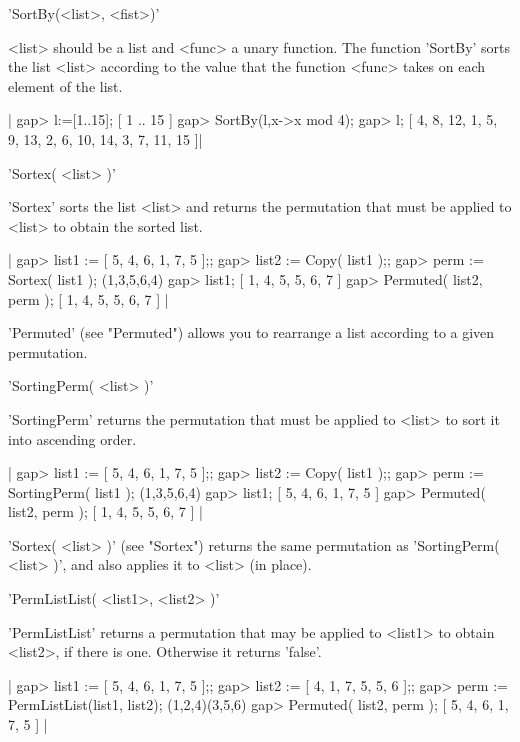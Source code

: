'SortBy(<list>, <fist>)'

<list>  should be a list and <func> a unary function. The function 'SortBy'
sorts the list <list> according to the value that the function <func> takes
on each element of the list.

|   gap> l:=[1..15];
   [ 1 .. 15 ]
   gap> SortBy(l,x->x mod 4);      
   gap> l;
   [ 4, 8, 12, 1, 5, 9, 13, 2, 6, 10, 14, 3, 7, 11, 15 ]|


'Sortex( <list> )'

'Sortex' sorts the list <list> and  returns the  permutation that must be
applied to <list> to obtain the sorted list.

|    gap> list1 := [ 5, 4, 6, 1, 7, 5 ];;
    gap> list2 := Copy( list1 );;
    gap> perm := Sortex( list1 );
    (1,3,5,6,4)
    gap> list1;
    [ 1, 4, 5, 5, 6, 7 ]
    gap> Permuted( list2, perm );
    [ 1, 4, 5, 5, 6, 7 ] |

'Permuted' (see "Permuted") allows you to rearrange a list according to a
given permutation.


'SortingPerm( <list> )'

'SortingPerm' returns  the permutation that must be  applied to <list> to
sort it into ascending order.

|    gap> list1 := [ 5, 4, 6, 1, 7, 5 ];;
    gap> list2 := Copy( list1 );;
    gap> perm := SortingPerm( list1 );
    (1,3,5,6,4)
    gap> list1;
    [ 5, 4, 6, 1, 7, 5 ]
    gap> Permuted( list2, perm );
    [ 1, 4, 5, 5, 6, 7 ] |

'Sortex( <list> )' (see "Sortex") returns the same permutation as
'SortingPerm( <list> )', and also applies it to <list> (in place).


'PermListList( <list1>, <list2> )'

'PermListList' returns a  permutation that may  be applied  to <list1> to
obtain <list2>, if there is one. Otherwise it returns 'false'.

|    gap> list1 := [ 5, 4, 6, 1, 7, 5 ];;
    gap> list2 := [ 4, 1, 7, 5, 5, 6 ];;
    gap> perm := PermListList(list1, list2);
    (1,2,4)(3,5,6)
    gap> Permuted( list2, perm );
    [ 5, 4, 6, 1, 7, 5 ] |


